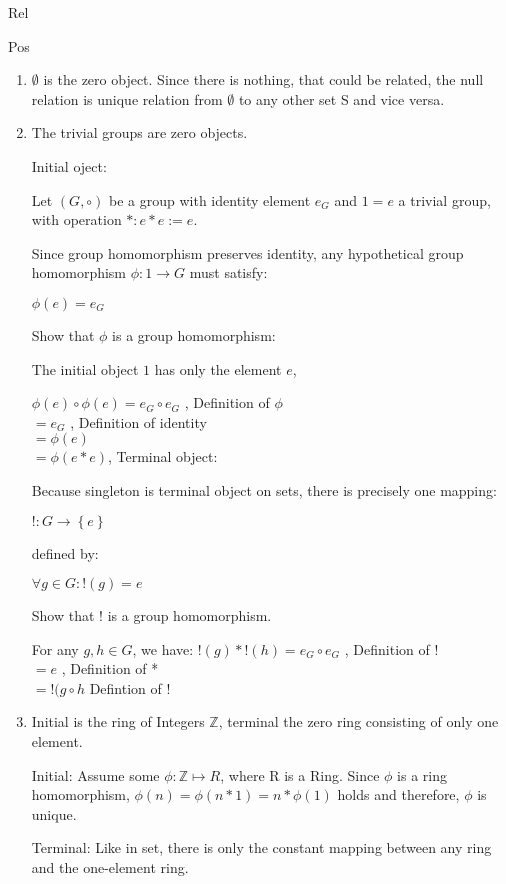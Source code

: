 \begin {definition}{Rel}
\begin{definition}{Pos}
\begin{answer}
  \begin{enumerate}
  \item $\emptyset$ is the zero object. Since there is nothing, that could be related, the null relation is unique relation from $\emptyset$ to any other set S and vice versa.
  \item The trivial groups are zero objects.

    Initial oject:

    Let $\left({G, \circ}\right)$ be a group with identity element $e_G$ and $1={e}$ a trivial group, with operation $*: e*e := e$.

    Since group homomorphism preserves identity, any hypothetical group homomorphism $\phi: 1 \to G$ must satisfy:

    $\phi (e) = e_G$

    Show  that $\phi$ is  a group homomorphism:

    The initial object $1$ has only the element $e$,

    $\phi (e) \circ \phi (e) = e_G \circ e_G $ , Definition of $\phi$
    \\$= e_G$ , Definition of identity
    \\$= \phi (e)$
    \\$= \phi (e * e)$, Terminal object:

    Because singleton is terminal object on sets, there is precisely one mapping:

    $!: G \to \left\{{e}\right\}$

    defined by:

    $\forall g \in G: ! (g) = e$

    Show that $!$ is a group homomorphism.

    For any $g, h \in G$, we have:
    $!(g)*!(h) = e_G \circ e_G $ , Definition of !
    \\$= e$ , Definition of *
    \\$= !(g \circ h$ Defintion of !

  \item Initial is the ring of Integers $\mathbb{Z}$, terminal the zero ring consisting of only one element.

    Initial: Assume some $ \phi: \mathbb{Z} \mapsto R $, where R is a Ring. Since $\phi$ is a ring homomorphism, $\phi(n) = \phi(n*1) = n*\phi(1)$ holds and therefore, $\phi$ is unique.

    Terminal: Like in set, there is only the constant mapping between any ring and the one-element ring.
  \end{enumerate}
\end{answer}


\end{definition}
\end{definition}
